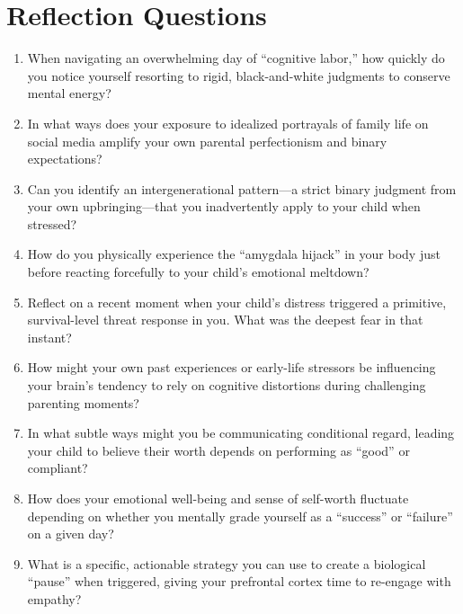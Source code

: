 \section{Reflection Questions}
\begin{reflection}
\begin{enumerate}[itemsep=0pt, parsep=0pt, topsep=0pt]
  \item When navigating an overwhelming day of ``cognitive labor,'' how quickly do you notice yourself resorting to rigid, black-and-white judgments to conserve mental energy?
  \item In what ways does your exposure to idealized portrayals of family life on social media amplify your own parental perfectionism and binary expectations?
  \item Can you identify an intergenerational pattern---a strict binary judgment from your own upbringing---that you inadvertently apply to your child when stressed?
  \item How do you physically experience the ``amygdala hijack'' in your body just before reacting forcefully to your child's emotional meltdown?
  \item Reflect on a recent moment when your child's distress triggered a primitive, survival-level threat response in you. What was the deepest fear in that instant?
  \item How might your own past experiences or early-life stressors be influencing your brain's tendency to rely on cognitive distortions during challenging parenting moments?
  \item In what subtle ways might you be communicating conditional regard, leading your child to believe their worth depends on performing as ``good'' or compliant?
  \item How does your emotional well-being and sense of self-worth fluctuate depending on whether you mentally grade yourself as a ``success'' or ``failure'' on a given day?
  \item What is a specific, actionable strategy you can use to create a biological ``pause'' when triggered, giving your prefrontal cortex time to re-engage with empathy?
\end{enumerate}
\end{reflection}
